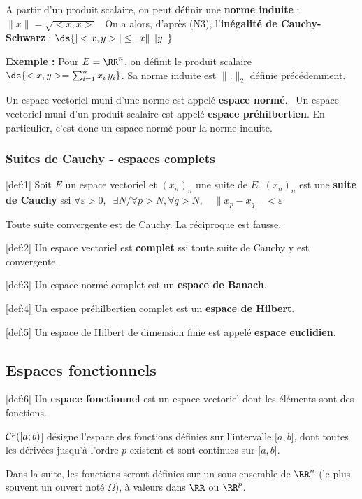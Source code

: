\documentclass[11pt]{amsart}
\begin{document}
A partir d’un produit scalaire, on peut définir une \textbf{norme induite} :
$ \| x \| = \sqrt{<x,x>} $ \
On a alors, d’après (N3), l’\textbf{inégalité de Cauchy-Schwarz} :
$\ds{ | <x,y> | \le \| x \| \; \| y \| }$


\textbf{Exemple :} Pour $E=\RR^n$, on définit le produit scalaire
$\ds{<x,y> = \sum_{i=1}^n x_i \, y_i}$. Sa norme induite est
$\| . \|_2$ définie précédemment.


Un espace vectoriel muni d’une norme est appelé \textbf{espace normé}. \
Un espace vectoriel muni d’un produit scalaire est appelé \textbf{espace
préhilbertien}. En particulier, c’est donc un espace normé pour la norme
induite.


\hypertarget{x-suites-de-cauchy---espaces-complets}{\subsubsection*{Suites de Cauchy - espaces complets}}
[def:1] Soit $E$ un espace vectoriel et
$(x_n)_n$ une suite de $E$.
$(x_n)_n$ est une \textbf{suite de Cauchy} ssi
$\forall \varepsilon > 0,\;\; \exists N / \forall p>N, \forall q>N, \quad \|x_p - x_q \| < \varepsilon$


Toute suite convergente est de Cauchy. La réciproque est fausse.


[def:2] Un espace vectoriel est \textbf{complet} ssi toute suite de Cauchy y
est convergente.


[def:3] Un espace normé complet est un \textbf{espace de Banach}.


[def:4] Un espace préhilbertien complet est un \textbf{espace de Hilbert}. \


[def:5] Un espace de Hilbert de dimension finie est appelé \textbf{espace
euclidien}.


\hypertarget{x-espaces-fonctionnels}{\subsection*{Espaces fonctionnels}}
[def:6] Un \textbf{espace fonctionnel} est un espace vectoriel dont les
éléments sont des fonctions.


${\cal C}^p([a;b)$] désigne l’espace des fonctions définies
sur l’intervalle $[a,b$], dont toutes les dérivées jusqu’à
l’ordre $p$ existent et sont continues sur
$[a,b$].


Dans la suite, les fonctions seront définies sur un sous-ensemble de
$\RR^n$ (le plus souvent un ouvert noté
$\Omega$), à valeurs dans $\RR$ ou
$\RR^p$.
\end{document}
